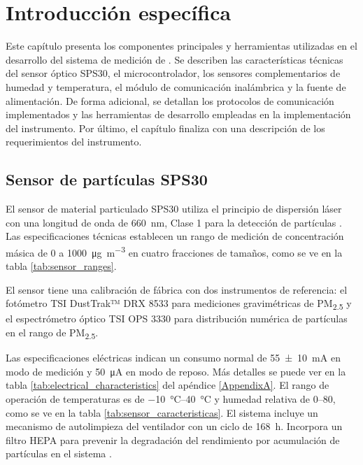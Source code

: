 \chapter{Introducción específica} %

\label{Chapter2}


Este capítulo presenta los componentes principales y herramientas utilizadas en el desarrollo del sistema de medición de \MPF. Se describen las características técnicas del sensor óptico SPS30, el microcontrolador, los sensores complementarios de humedad y temperatura, el módulo de comunicación inalámbrica y la fuente de alimentación. De forma adicional, se detallan los protocolos de comunicación implementados y las herramientas de desarrollo empleadas en la implementación del instrumento. Por último, el capítulo finaliza con una descripción de los requerimientos del instrumento.


\section{Sensor de partículas SPS30}

El sensor de material particulado SPS30 utiliza el principio de dispersión láser con una longitud de onda de \SI{660}{\nano\meter}, Clase 1  para la detección de partículas \cite{Sensirion2023}. 
Las especificaciones técnicas establecen un rango de medición de concentración másica de 0 a \SI{1000}{\micro\gram\per\cubic\meter} en cuatro fracciones de tamaños, como se ve en la tabla \ref{tab:sensor_ranges}. 


El sensor tiene una calibración de fábrica con  dos instrumentos de referencia: el fotómetro TSI DustTrak™ DRX 8533 para mediciones gravimétricas de PM\textsubscript{2.5} y el espectrómetro óptico TSI OPS 3330 para distribución numérica de partículas en el rango de PM\textsubscript{2.5}.

Las especificaciones eléctricas indican un consumo normal de \SI{55\pm10}{\milli\ampere} en modo de medición y \SI{50}{\micro\ampere} en modo de reposo. Más detalles se puede ver en la tabla \ref{tab:electrical_characteristics} del apéndice \ref{AppendixA}. El rango de operación de temperaturas es de \SIrange{-10}{40}{\celsius} y humedad relativa de \SIrange{0}{80}{\RH}, como se ve en la tabla \ref{tab:sensor_caracteristicas}. El sistema incluye un mecanismo de autolimpieza del ventilador con un ciclo de \SI{168}{\hour}. Incorpora un filtro HEPA para prevenir la degradación del rendimiento por acumulación de partículas en el sistema \cite{alfano2020}. 

